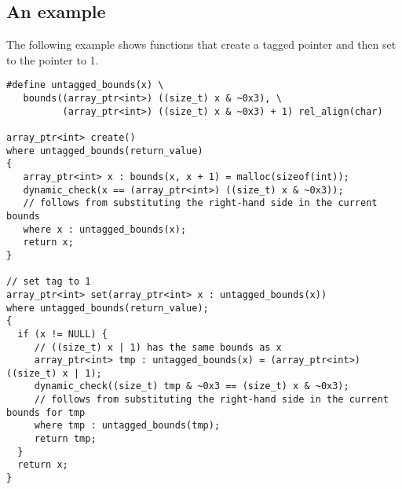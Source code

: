 \subsection{An example}

The following example shows functions that create a tagged pointer and then set 
to the pointer to 1.

\begin{verbatim}
#define untagged_bounds(x) \
   bounds((array_ptr<int>) ((size_t) x & ~0x3), \
          (array_ptr<int>) ((size_t) x & ~0x3) + 1) rel_align(char)

array_ptr<int> create() 
where untagged_bounds(return_value)
{
   array_ptr<int> x : bounds(x, x + 1) = malloc(sizeof(int));
   dynamic_check(x == (array_ptr<int>) ((size_t) x & ~0x3));
   // follows from substituting the right-hand side in the current bounds
   where x : untagged_bounds(x); 
   return x;
}

// set tag to 1
array_ptr<int> set(array_ptr<int> x : untagged_bounds(x)) 
where untagged_bounds(return_value);
{
  if (x != NULL) {
     // ((size_t) x | 1) has the same bounds as x                   
     array_ptr<int> tmp : untagged_bounds(x) = (array_ptr<int>) ((size_t) x | 1);
     dynamic_check((size_t) tmp & ~0x3 == (size_t) x & ~0x3);
     // follows from substituting the right-hand side in the current bounds for tmp
     where tmp : untagged_bounds(tmp);
     return tmp;
  }
  return x;
}
\end{verbatim}
